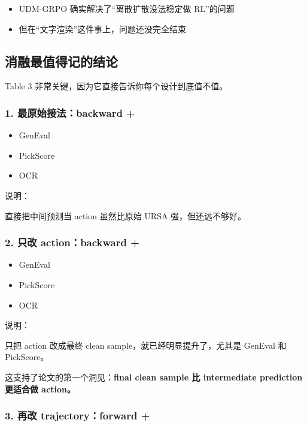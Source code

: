 \begin{itemize}[leftmargin=1.5em]
  \item UDM-GRPO 确实解决了“离散扩散没法稳定做 RL”的问题
  \item 但在“文字渲染”这件事上，问题还没完全结束
\end{itemize}

\subsection{消融最值得记的结论}

Table 3 非常关键，因为它直接告诉你每个设计到底值不值。

\subsubsection{1. 最原始接法：backward + }

\begin{itemize}[leftmargin=1.5em]
  \item GenEval 
  \item PickScore 
  \item OCR 
\end{itemize}

说明：

直接把中间预测当 action 虽然比原始 URSA 强，但还远不够好。

\subsubsection{2. 只改 action：backward + }

\begin{itemize}[leftmargin=1.5em]
  \item GenEval 
  \item PickScore 
  \item OCR 
\end{itemize}

说明：

只把 action 改成最终 clean sample，就已经明显提升了，尤其是 GenEval 和 PickScore。

这支持了论文的第一个洞见：\textbf{final clean sample 比 intermediate prediction 更适合做 action。}

\subsubsection{3. 再改 trajectory：forward + }

